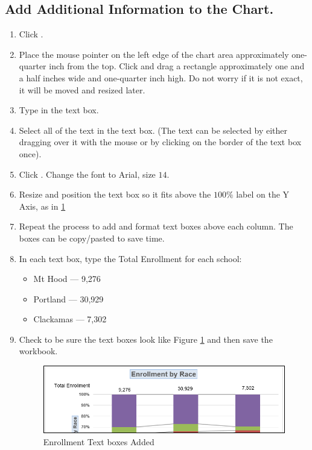 \subsection{Add Additional Information to the Chart.}

\begin{enumerate}
	\item Click .
	\item Place the mouse pointer on the left edge of the chart area approximately one-quarter inch from the top. Click and drag a rectangle approximately one and a half inches wide and one-quarter inch high. Do not worry if it is not exact, it will be moved and resized later.
	\item Type  in the text box.
	\item Select all of the text in the text box. (The text can be selected by either dragging over it with the mouse or by clicking on the border of the text box once). 
	\item Click . Change the font to Arial, size $ 14 $.
	\item Resize and position the text box so it fits above the $ 100\% $ label on the Y Axis, as in \ref{04:fig43}
	\item Repeat the process to add and format text boxes above each column. The boxes can be copy/pasted to save time.
	\item In each text box, type the Total Enrollment for each school:

	\begin{itemize}
		\item Mt Hood --- 9,276
		\item Portland --- 30,929
		\item Clackamas --- 7,302
	\end{itemize}

	\item Check to be sure the text boxes look like Figure \ref{04:fig43} and then save the  workbook.

	\begin{figure}[H]
		\centering
		\includegraphics[width=\maxwidth{.95\linewidth}]{gfx/ch04_fig43}
		\caption{Enrollment Text boxes Added}
		\label{04:fig43}
	\end{figure}


\end{enumerate}

